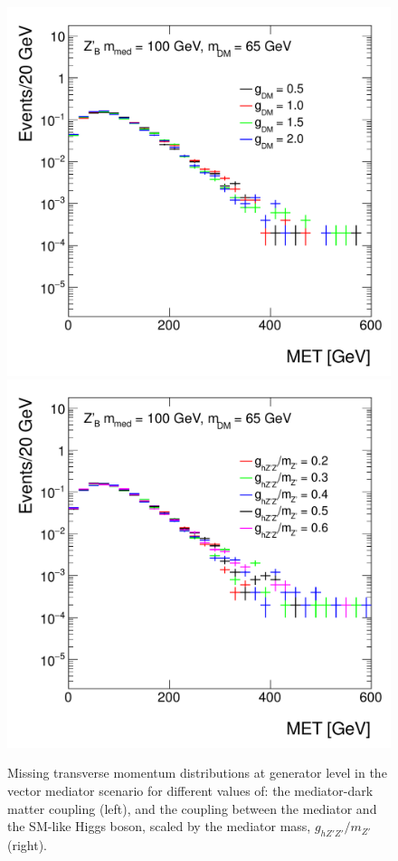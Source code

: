 \begin{figure}[hbpt!]
	\includegraphics[width=0.49\linewidth]{figures/EW/monoH/z_gdm_MET_et_Log}
	\includegraphics[width=0.49\linewidth]{figures/EW/monoH/z_ratio_MET_et_Log}
	\caption{Missing transverse momentum distributions at generator level in the vector 
		mediator scenario for different values of: the mediator-dark matter coupling \gdm (left),
		and the coupling between the mediator and the SM-like Higgs boson, scaled by the mediator mass, 
		$g_{hZ'Z'}/m_{Z'}$ (right).
		\label{fig:metVectorCoupling}}
\end{figure}

